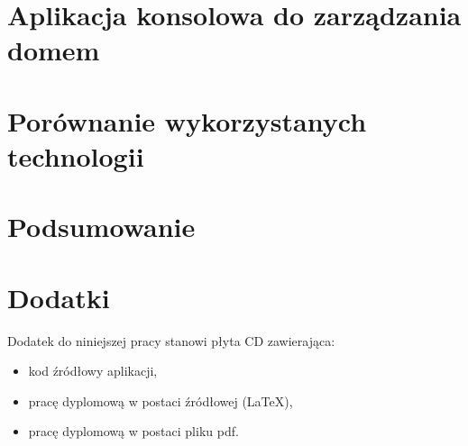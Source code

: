 \documentclass[11pt, a4paper,polish,twoside]{report}
\numberwithin{equation}{section}
\begin{document}
\chapter{Aplikacja konsolowa do zarządzania domem} \label{aplikacja_zarzadzanie}


\chapter{Porównanie wykorzystanych technologii}



\chapter{Podsumowanie}



%

\nocite{*}
\printbibliography 

\chapter*{Dodatki}
Dodatek do niniejszej pracy stanowi płyta CD zawierająca:
\begin{itemize}
\item kod źródłowy aplikacji,
\item pracę dyplomową w postaci źródłowej (LaTeX),
\item pracę dyplomową w postaci pliku pdf.
\end{itemize}

\newpage
{}	
\listoffigures

\newpage
{}	
\listoftables

\newpage
{}	


\end{document}
